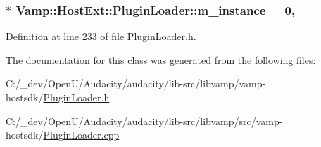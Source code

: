 \subsubsection[{\texorpdfstring{m\+\_\+instance}{m_instance}}]{ $\ast$ Vamp\+::\+Host\+Ext\+::\+Plugin\+Loader\+::m\+\_\+instance = 0\hspace{0.3cm}{\ttfamily [static]}, {\ttfamily [protected]}}\hypertarget{class_vamp_1_1_host_ext_1_1_plugin_loader_aaa4eae58ddbadf6537a95dbb6e957187}{}\label{class_vamp_1_1_host_ext_1_1_plugin_loader_aaa4eae58ddbadf6537a95dbb6e957187}


Definition at line 233 of file Plugin\+Loader.\+h.



The documentation for this class was generated from the following files\+:\begin{DoxyCompactItemize}
\item 
C\+:/\+\_\+dev/\+Open\+U/\+Audacity/audacity/lib-\/src/libvamp/vamp-\/hostsdk/\hyperlink{_plugin_loader_8h}{Plugin\+Loader.\+h}\item 
C\+:/\+\_\+dev/\+Open\+U/\+Audacity/audacity/lib-\/src/libvamp/src/vamp-\/hostsdk/\hyperlink{_plugin_loader_8cpp}{Plugin\+Loader.\+cpp}\end{DoxyCompactItemize}
